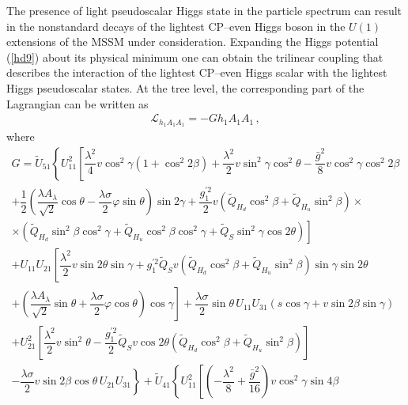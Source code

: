 \documentclass[12pt,a4paper]{article}
\begin{document}
The presence of light pseudoscalar Higgs state in the particle spectrum can result in the nonstandard decays of the lightest
CP--even Higgs boson in the $U(1)$ extensions of the MSSM under consideration. Expanding the Higgs potential  (\ref{hd9}) 
about its physical minimum one can obtain the trilinear coupling that describes the interaction of the lightest CP--even Higgs 
scalar with the lightest Higgs pseudoscalar states. At the tree level, the corresponding part of the Lagrangian can be written as
\begin{equation}
\begin{array}{l}
\mathcal{L}_{h_1 A_1 A_1}=-G h_1 A_1 A_1\,,
\end{array}
\label{hd29}
\end{equation}
where
\begin{equation}
\begin{array}{l}
G=\tilde{U}_{51}\left\{U_{11}^2 \left[\dfrac{\lambda^2}{4}v\cos^2\gamma (1+\cos^2 2\beta) + \dfrac{\lambda^2}{2} v \sin^2 \gamma \cos^2 \theta
-\dfrac{\bar{g}^2}{8} v \cos^2 \gamma \cos^2 2\beta \right.\right.\\[1mm]
\left.\left.+\dfrac{1}{2}\left(\dfrac{\lambda A_{\lambda}}{\sqrt{2}} \cos\theta -
\dfrac{\lambda \sigma}{2} \varphi \sin\theta\right)\sin 2\gamma+
\dfrac{g_1^{'2}}{2}v\left(\tilde{Q}_{H_d}\cos^2\beta+\tilde{Q}_{H_u}\sin^2\beta\right)\times\right.\right.\\[1mm]
\left.\left.\times\left(\tilde{Q}_{H_d}\sin^2\beta \cos^2\gamma +
\tilde{Q}_{H_u}\cos^2\beta \cos^2\gamma +\tilde{Q}_{S}\sin^2\gamma \cos 2\theta\right)\right]\right.\\[1mm]
\left.+ U_{11} U_{21} \left[\dfrac{\lambda^2}{2} v \sin 2\theta \sin \gamma + g_1^{'2} \tilde{Q}_S v \left(\tilde{Q}_{H_d}\cos^2\beta
+\tilde{Q}_{H_u}\sin^2\beta\right) \sin\gamma \sin 2\theta \right.\right.\\[1mm]
\left.\left. + \left(\dfrac{\lambda A_{\lambda}}{\sqrt{2}}\sin\theta + \dfrac{\lambda \sigma}{2} \varphi \cos\theta\right) \cos\gamma\right]
+ \dfrac{\lambda\sigma}{2} \sin\theta\, U_{11} U_{31} (s\cos\gamma + v \sin 2\beta \sin\gamma)\right.\\[1mm]
\left. + U_{21}^2\left[\dfrac{\lambda^2}{2}v\sin^2\theta - \dfrac{g_1^{'2}}{2} \tilde{Q}_S v \cos 2\theta
\left(\tilde{Q}_{H_d}\cos^2\beta+\tilde{Q}_{H_u}\sin^2\beta\right)\right] \right.\\[1mm]
\left.- \dfrac{\lambda\sigma}{2} v \sin 2\beta \cos\theta\, U_{21} U_{31} \right\}
+\tilde{U}_{41}\left\{U_{11}^2 \left[\left(-\dfrac{\lambda^2}{8}+\dfrac{\bar{g}^2}{16}\right)v\cos^2\gamma \sin 4\beta\right.\right.\\[1mm]

\end{array}
\end{equation}
\end{document}
